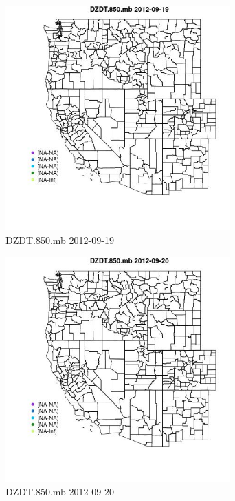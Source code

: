 \begin{figure} 
\centering  
\includegraphics[width=0.77\textwidth]{Code_Outputs/ML_input_report_ML_input_PM25_Step5_part_d_de_duplicated_aves_ML_input_MapObsDZDT850mb2012-09-19.jpg} 
\caption{\label{fig:ML_input_report_ML_input_PM25_Step5_part_d_de_duplicated_aves_ML_inputMapObsDZDT850mb2012-09-19}DZDT.850.mb 2012-09-19} 
\end{figure} 
 

\begin{figure} 
\centering  
\includegraphics[width=0.77\textwidth]{Code_Outputs/ML_input_report_ML_input_PM25_Step5_part_d_de_duplicated_aves_ML_input_MapObsDZDT850mb2012-09-20.jpg} 
\caption{\label{fig:ML_input_report_ML_input_PM25_Step5_part_d_de_duplicated_aves_ML_inputMapObsDZDT850mb2012-09-20}DZDT.850.mb 2012-09-20} 
\end{figure} 
 

